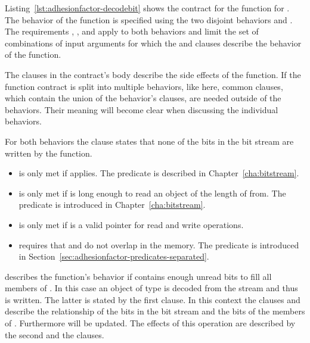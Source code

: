 Listing~\ref{lst:adhesionfactor-decodebit} shows the contract for the  function
for .
The behavior of the function is specified using the two disjoint behaviors
 and .
The requirements , ,
 and  apply to both behaviors
and limit the set of combinations of input arguments for which the
 and  clauses describe the behavior of the function.

The  clauses in the contract's body describe the side effects
of the function. If the function contract is split into multiple
behaviors, like here, common  clauses, which contain the union
of the behavior's  clauses, are needed outside of the behaviors.
Their meaning will become clear when discussing the individual  behaviors.

For both behaviors the  clause states that
none of the bits in the bit stream are written by the function.

\begin{itemize}
\item
{} is only met if  applies.
The  predicate is described in Chapter~\ref{cha:bitstream}.
\item
{} is only met if 
is long enough to read an object of the length of  from.
The  predicate is introduced in Chapter~\ref{cha:bitstream}.
\item
{} is only met if  is a valid pointer for read and write operations.
\item
{} requires that  and  do not overlap in the memory.
The  predicate is introduced in
Section~\ref{sec:adhesionfactor-predicates-separated}.
\end{itemize}




 describes the function's behavior if
 contains enough unread bits to fill all members of . 
In this case an object of type  is decoded from the stream
and thus  is written.
The latter is stated by the first  clause.
In this context the  clauses  and 
describe the relationship of the bits in the bit stream and
the bits of the members of .
Furthermore  will be updated.
The effects of this operation are described by the second
 and the  clauses.

